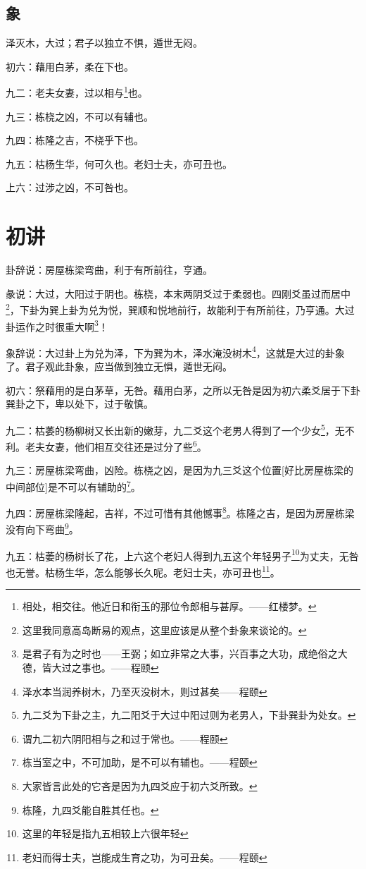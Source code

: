 \documentclass[12pt,oneside]{book}
\begin{document}
\subsection{象}
泽灭木，大过；君子以独立不惧，遁世无闷。

初六：藉用白茅，柔在下也。

九二：老夫女妻，过以相与\footnote{相处，相交往。他近日和衔玉的那位令郎相与甚厚。——红楼梦。}也。

九三：栋桡之凶，不可以有辅也。

九四：栋隆之吉，不桡乎下也。

九五：枯杨生华，何可久也。老妇士夫，亦可丑也。

上六：过涉之凶，不可咎也。

\section{初讲}
卦辞说：房屋栋梁弯曲，利于有所前往，亨通。

彖说：大过，大阳过于阴也。栋桡，本末两阴爻过于柔弱也。四刚爻虽过而居中\footnote{这里我同意高岛断易的观点，这里应该是从整个卦象来谈论的。}，下卦为巽上卦为兑为悦，巽顺和悦地前行，故能利于有所前往，乃亨通。大过卦运作之时很重大啊\footnote{是君子有为之时也——王弼；如立非常之大事，兴百事之大功，成绝俗之大德，皆大过之事也。——程颐}！

象辞说：大过卦上为兑为泽，下为巽为木，泽水淹没树木\footnote{泽水本当润养树木，乃至灭没树木，则过甚矣——程颐}，这就是大过的卦象了。君子观此卦象，应当做到独立无惧，遁世无闷。

初六：祭藉用的是白茅草，无咎。藉用白茅，之所以无咎是因为初六柔爻居于下卦巽卦之下，卑以处下，过于敬慎。

九二：枯萎的杨柳树又长出新的嫩芽，九二爻这个老男人得到了一个少女\footnote{九二爻为下卦之主，九二阳爻于大过中阳过则为老男人，下卦巽卦为处女。}，无不利。老夫女妻，他们相互交往还是过分了些\footnote{谓九二初六阴阳相与之和过于常也。——程颐}。

九三：房屋栋梁弯曲，凶险。栋桡之凶，是因为九三爻这个位置[好比房屋栋梁的中间部位]是不可以有辅助的\footnote{栋当室之中，不可加助，是不可以有辅也。——程颐}。

九四：房屋栋梁隆起，吉祥，不过可惜有其他憾事\footnote{大家皆言此处的它吝是因为九四爻应于初六爻所致。}。栋隆之吉，是因为房屋栋梁没有向下弯曲\footnote{栋隆，九四爻能自胜其任也。}。

九五：枯萎的杨树长了花，上六这个老妇人得到九五这个年轻男子\footnote{这里的年轻是指九五相较上六很年轻}为丈夫，无咎也无誉。枯杨生华，怎么能够长久呢。老妇士夫，亦可丑也\footnote{老妇而得士夫，岂能成生育之功，为可丑矣。——程颐}。
\end{document}

